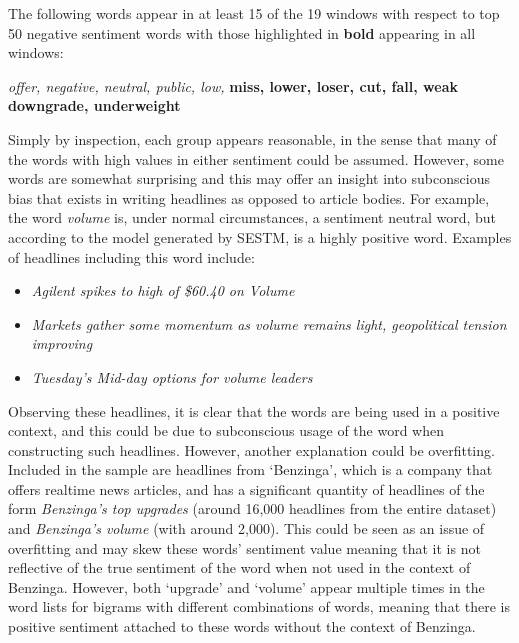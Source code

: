 \noindent
The following words appear in at least 15 of the 19 windows with respect to top 50 negative sentiment words with those highlighted in \textbf{bold} appearing in all windows:
\begin{center}
      \textit{offer, negative, neutral, public, low,} \textbf{miss, lower, loser, cut, fall, weak downgrade, underweight}
\end{center}

Simply by inspection, each group appears reasonable, in the sense that many of the words with high values in either sentiment could be assumed. However, some words are somewhat surprising and this may offer an insight into subconscious bias that exists in writing headlines as opposed to article bodies. For example, the word \textit{volume} is, under normal circumstances, a sentiment neutral word, but according to the model generated by SESTM, is a highly positive word. Examples of headlines including this word include:
\begin{itemize}
      \item \textit{Agilent spikes to high of \$60.40 on Volume}
      \item \textit{Markets gather some momentum as volume remains light, geopolitical tension improving}
      \item \textit{Tuesday's Mid-day options for volume leaders}
\end{itemize}

Observing these headlines, it is clear that the words are being used in a positive context, and this could be due to subconscious usage of the word when constructing such headlines. However, another explanation could be overfitting. Included in the sample are headlines from `Benzinga', which is a company that offers realtime news articles, and has a significant quantity of headlines of the form \textit{Benzinga's top upgrades} (around 16,000 headlines from the entire dataset) and \textit{Benzinga's volume} (with around 2,000). This could be seen as an issue of overfitting and may skew these words' sentiment value meaning that it is not reflective of the true sentiment of the word when not used in the context of Benzinga. However, both `upgrade' and `volume' appear multiple times in the word lists for bigrams with different combinations of words, meaning that there is positive sentiment attached to these words without the context of Benzinga.


